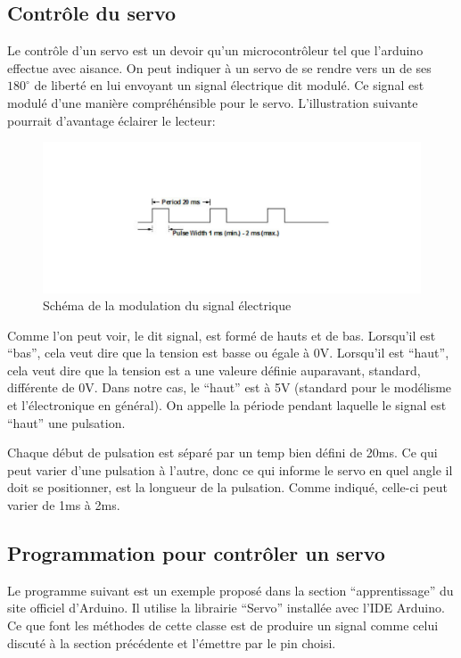 \documentclass[a4paper,12pt]{article}
\begin{document}
{\subsection{Contr\^ole du servo}
Le contr\^ole d'un servo est un devoir qu'un microcontr\^oleur tel que
l'arduino effectue avec aisance. On peut indiquer \`a un servo de se rendre vers
un de ses $180^{\circ}$ de libert\'e en lui envoyant un signal \'electrique dit
modul\'e. Ce signal est modul\'e d'une mani\`ere compréh\'ensible pour le
servo. L'illustration suivante
pourrait d'avantage \'eclairer le lecteur:

\begin{figure}[h]
\centering
\includegraphics[width=1.0\textwidth]{figures/ServoPwm}
    \caption{\label{ServoPwm}Sch\'ema de la modulation du signal
      \'electrique \protect
      \cite{WikiServo}
    }
\end{figure}

Comme l'on peut voir, le dit signal, est form\'e de hauts et de
bas. Lorsqu'il est ``bas'', cela veut dire que la tension est basse ou \'egale
\`a 0V. Lorsqu'il est
``haut'', cela veut dire que la tension est a une valeure d\'efinie auparavant,
standard, diff\'erente de 0V. Dans notre cas, le ``haut'' est \`a 5V (standard
pour le mod\'elisme et l'\'electronique en g\'en\'eral). On appelle la
p\'eriode pendant laquelle le signal est ``haut'' une pulsation.

Chaque d\'ebut de pulsation est s\'epar\'e par un temp bien d\'efini de
20ms. Ce qui peut varier d'une pulsation \`a l'autre, donc ce qui informe le
servo en quel angle il doit se positionner, est la longueur de la
pulsation. Comme indiqu\'e, celle-ci peut varier de 1ms \`a 2ms.

\subsection{Programmation pour contr\^oler un servo}
Le programme suivant est un exemple propos\'e dans la section
``apprentissage'' du site officiel d'Arduino. Il utilise la librairie
``Servo'' install\'ee avec l'IDE Arduino. Ce que font les m\'ethodes de cette
classe est de produire un signal comme celui discut\'e \`a la section
pr\'ec\'edente et l'\'emettre par le pin choisi.

}
\end{document}
